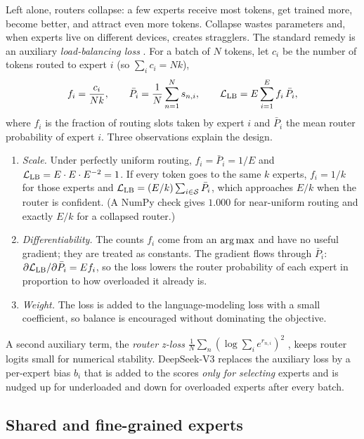 Left alone, routers collapse: a few experts receive most tokens, get trained more, become
better, and attract even more tokens. Collapse wastes parameters and, when experts live on
different devices, creates stragglers. The standard remedy is an auxiliary
\emph{load-balancing loss} \citep{c01-lepikhin2021gshard,fedus2022switch}. For a batch of
$N$ tokens, let $c_i$ be the number of tokens routed to expert $i$ (so $\sum_i c_i = Nk$),
\begin{equation}\label{eq:c01-lb-loss}
  f_i = \frac{c_i}{Nk},\qquad
  \bar{P}_i = \frac{1}{N}\sum_{n=1}^{N} s_{n,i},\qquad
  \mathcal{L}_{\mathrm{LB}} = E\sum_{i=1}^{E} f_i\,\bar{P}_i ,
\end{equation}
where $f_i$ is the fraction of routing slots taken by expert $i$ and $\bar{P}_i$ the mean
router probability of expert $i$. Three observations explain the design.
\begin{enumerate}
  \item \emph{Scale.} Under perfectly uniform routing, $f_i = \bar{P}_i = 1/E$ and
  $\mathcal{L}_{\mathrm{LB}} = E \cdot E \cdot E^{-2} = 1$. If every token goes to the same $k$
  experts, $f_i = 1/k$ for those experts and
  $\mathcal{L}_{\mathrm{LB}} = (E/k)\sum_{i\in\mathcal{S}}\bar{P}_i$, which approaches $E/k$ when
  the router is confident. (A NumPy check gives $1.000$ for near-uniform routing and exactly
  $E/k$ for a collapsed router.)
  \item \emph{Differentiability.} The counts $f_i$ come from an $\operatorname*{arg\,max}$ and have no
  useful gradient; they are treated as constants. The gradient flows through $\bar{P}_i$:
  $\partial\mathcal{L}_{\mathrm{LB}}/\partial\bar{P}_i = E f_i$, so the loss lowers the router
  probability of each expert in proportion to how overloaded it already is.
  \item \emph{Weight.} The loss is added to the language-modeling loss with a small
  coefficient, so balance is encouraged without dominating the objective.
\end{enumerate}
A second auxiliary term, the \emph{router z-loss}
$\frac{1}{N}\sum_n(\log\sum_i e^{r_{n,i}})^2$ \citep{c01-zoph2022stmoe}, keeps router logits
small for numerical stability. DeepSeek-V3 \citep{c01-deepseek2024v3} replaces the
auxiliary loss by a per-expert bias $b_i$ that is added to the scores \emph{only for
selecting} experts and is nudged up for underloaded and down for overloaded experts after
every batch.

\subsection{Shared and fine-grained experts}\label{sec:c01-shared-experts}

